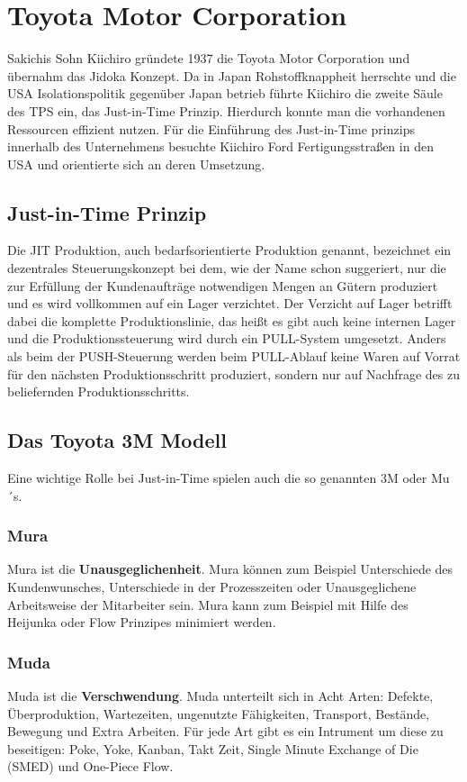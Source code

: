 \documentclass[00_ToyotaProduktionssystem.tex]{subfiles}
\begin{document}
\section{Toyota Motor Corporation}
Sakichis Sohn Kiichiro gründete 1937 die Toyota Motor Corporation und übernahm das Jidoka Konzept. Da in Japan Rohstoffknappheit herrschte und die USA Isolationspolitik gegenüber Japan betrieb führte Kiichiro die zweite Säule des TPS ein, das Just-in-Time Prinzip. Hierdurch konnte man die vorhandenen Ressourcen effizient nutzen. Für die Einführung des Just-in-Time prinzips innerhalb des Unternehmens besuchte Kiichiro Ford Fertigungsstraßen in den USA und orientierte sich an deren Umsetzung.
\subsection{Just-in-Time Prinzip}
Die JIT Produktion, auch bedarfsorientierte Produktion genannt, bezeichnet ein dezentrales Steuerungskonzept bei dem,  wie der Name schon suggeriert, nur die zur Erfüllung der Kundenaufträge notwendigen Mengen an Gütern produziert und es wird vollkommen auf ein Lager verzichtet. Der Verzicht auf Lager betrifft dabei die komplette Produktionslinie, das heißt es gibt auch keine internen Lager und die Produktionssteuerung wird durch ein PULL-System umgesetzt. Anders als beim der PUSH-Steuerung werden beim PULL-Ablauf keine Waren auf Vorrat für den nächsten Produktionsschritt produziert, sondern nur auf Nachfrage des zu beliefernden Produktionsschritts.
\subsection{Das Toyota 3M Modell}
Eine wichtige Rolle bei Just-in-Time spielen auch die so genannten 3M oder Mu´s.
\subsubsection{Mura}
Mura ist die \textbf{Unausgeglichenheit}. Mura können zum Beispiel Unterschiede des Kundenwunsches, Unterschiede in der Prozesszeiten oder Unausgeglichene Arbeitsweise der Mitarbeiter sein. Mura kann zum Beispiel mit Hilfe des Heijunka oder Flow Prinzipes minimiert werden.
\subsubsection{Muda}
Muda ist die \textbf{Verschwendung}. Muda unterteilt sich in Acht Arten: Defekte, Überproduktion, Wartezeiten, ungenutzte Fähigkeiten, Transport, Bestände, Bewegung und Extra Arbeiten. Für jede Art gibt es ein Intrument um diese zu beseitigen: Poke, Yoke, Kanban, Takt Zeit, Single Minute Exchange of Die (SMED) und One-Piece Flow.
\end{document}
